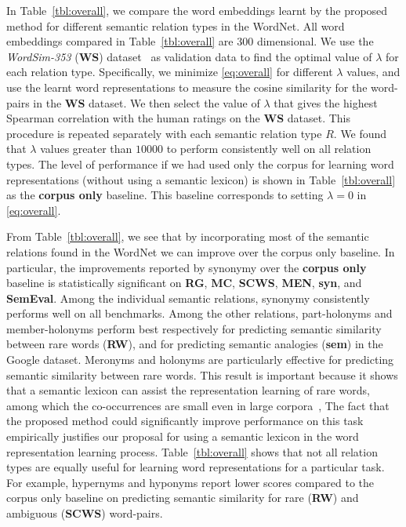 \documentclass[letterpaper]{article}
\newcommand{\citep}{\cite}
\begin{document}
In Table~\ref{tbl:overall}, we compare the word embeddings learnt by the proposed method for different semantic relation
types in the WordNet.
All word embeddings compared in Table~\ref{tbl:overall} are $300$ dimensional.
We use the \emph{WordSim-353} (\textbf{WS}) dataset~\citep{Finklestein:02}
as validation data to find the optimal value of $\lambda$ for each relation type.
Specifically, we minimize \eqref{eq:overall} for different $\lambda$ values,
and use the learnt word representations to measure the cosine similarity for the word-pairs in the \textbf{WS} dataset.
We then select the value of $\lambda$ that gives the highest Spearman correlation
with the human ratings on the \textbf{WS} dataset. This procedure is repeated separately with each semantic relation type $R$.
We found that $\lambda$ values greater than $10000$ to perform consistently well on all relation types.
The level of performance if we had used only the corpus for learning word representations (without using a semantic lexicon)
is shown in Table~\ref{tbl:overall} as the \textbf{corpus only} baseline.
This baseline corresponds to setting $\lambda = 0$ in \eqref{eq:overall}.

From Table~\ref{tbl:overall}, we see that by incorporating most of the semantic relations found in the WordNet we can
improve over the corpus only baseline.
In particular, the improvements reported by synonymy over the \textbf{corpus only} baseline is statistically significant on \textbf{RG},
\textbf{MC}, \textbf{SCWS}, \textbf{MEN}, \textbf{syn}, and \textbf{SemEval}.
Among the individual semantic relations, synonymy consistently performs well on all benchmarks.
Among the other relations, part-holonyms and member-holonyms perform best respectively for predicting semantic similarity
between rare words (\textbf{RW}), and for predicting semantic analogies (\textbf{sem}) in the Google dataset.
Meronyms and holonyms are particularly effective for predicting semantic similarity between rare words.
This result is important because it shows that a semantic lexicon can assist the
representation learning of rare words, among which the co-occurrences are small even in large corpora~\citep{Luong:CoNLL:2013},
The fact that the proposed method could significantly improve performance on this task
empirically justifies our proposal for using a semantic lexicon in the word representation learning process.
Table~\ref{tbl:overall} shows that not all relation types are equally useful for learning word representations for a particular task.
For example, hypernyms and hyponyms report lower scores compared to the corpus only baseline on
predicting semantic similarity for rare (\textbf{RW}) and ambiguous (\textbf{SCWS}) word-pairs.
\end{document}

